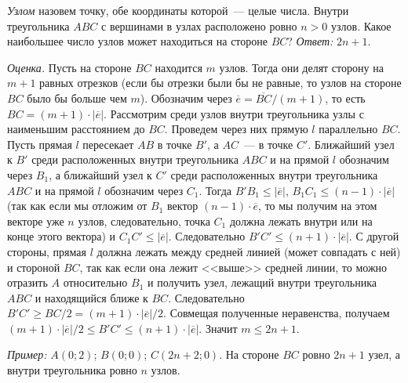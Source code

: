 \problem{}
\emph{Узлом} назовем точку, обе координаты которой~--- целые числа.
Внутри треугольника $ABC$ с вершинами в узлах расположено ровно $n > 0$ узлов.
Какое наибольшее число узлов может находиться на стороне $BC$?
\solution
\emph{Ответ:} $2 n + 1$.
\par
\emph{Оценка.}
Пусть на стороне $BC$ находится $m$ узлов.
Тогда они делят сторону на $m + 1$ равных отрезков
(если бы отрезки были бы не равные, то узлов на стороне $BC$ было бы больше чем
$m$).
Обозначим через $\overline{e} = \overline{BC} / (m + 1)$, то есть
$BC = (m + 1) \cdot |\overline{e}|$.
Рассмотрим среди узлов внутри треугольника узлы с наименьшим расстоянием до
$BC$.
Проведем через них прямую $l$ параллельно $BC$.
Пусть прямая $l$ пересекает $AB$ в точке $B'$, а $AC$~--- в точке $C'$.
Ближайший узел к $B'$ среди расположенных внутри треугольника $ABC$ и на прямой
$l$ обозначим через $B_1$, а ближайший узел к $C'$ среди расположенных внутри
треугольника $ABC$ и на прямой $l$ обозначим через $C_1$.
Тогда $B' B_1 \leq |\overline{e}|$, $B_1 C_1 \leq (n - 1) \cdot |\overline{e}|$
(так как если мы отложим от $B_1$ вектор $(n - 1) \cdot \overline{e}$,
то мы получим на этом векторе уже $n$ узлов, следовательно, точка $C_1$ должна
лежать внутри или на конце этого вектора)
и $C_1 C' \leq |\overline{e}|$.
Следовательно $B'C' \leq (n + 1) \cdot |\overline{e}|$.
С другой стороны, прямая $l$ должна лежать между средней линией
(может совпадать с ней) и стороной $BC$, так как если она лежит
<<выше>> средней линии, то можно отразить $A$ относительно $B_1$ и получить
узел, лежащий внутри треугольника $ABC$ и находящийся ближе к $BC$.
Следовательно $B'C' \geq BC / 2 = (m + 1) \cdot |\overline{e}| / 2$.
Совмещая полученные неравенства, получаем
\(
    (m + 1) \cdot |\overline{e}| / 2
\leq
    B' C'
\leq
    (n + 1) \cdot |\overline{e}|
\).
Значит $m \leq 2 n + 1$.
\par
\emph{Пример:} $A(0; 2)$; $B(0; 0)$; $C(2 n + 2; 0)$.
На стороне $BC$ ровно $2 n + 1$ узел, а внутри треугольника ровно $n$ узлов.
\endproblem
